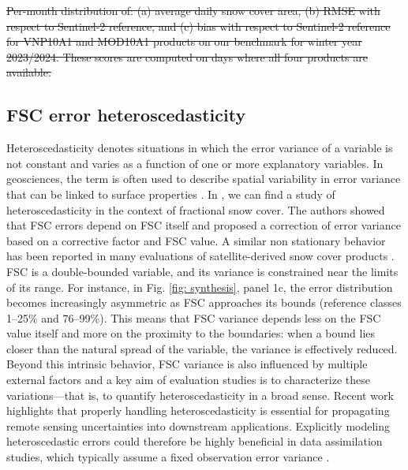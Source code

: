 \documentclass[tc, manuscript]{copernicus}
\providecommand{\DIFdeltex}[1]{{\protect\color{red}\sout{#1}}}                      %
\providecommand{\DIFdelbegin}{} %
\providecommand{\DIFdelend}{} %
\providecommand{\DIFdelFL}[1]{\DIFdel{#1}} %
\providecommand{\DIFdel}[1]{\texorpdfstring{\DIFdeltex{#1}}{}} %
\begin{document}
\DIFdelbegin %
{%
\DIFdelFL{Per-month distribution of: (a) average daily snow cover area, (b) RMSE with respect to Sentinel-2 reference, and (c) bias with respect to Sentinel-2 reference for VNP10A1 and MOD10A1 products on our benchmark for winter year 2023/2024. These scores are computed on days where all four products are available.}}


\DIFdelend \subsection{FSC error heteroscedasticity} 

Heteroscedasticity denotes situations in which the error variance of a variable is not constant and varies as a function of one or more explanatory variables. In geosciences, the term is often used to describe spatial variability in error variance that can be linked to surface properties \citep{hugonnet2022UncertaintyAnalysisDigital}. In \citep{aalstad_evaluating_2020}, we can find a study of heteroscedasticity in the context of fractional snow cover. The authors showed that FSC errors depend on FSC itself and proposed a correction of error variance based on a corrective factor and FSC value. A similar non stationary behavior has been reported in many evaluations of satellite-derived snow cover products \citep{jacques-hamilton_measurement_2025, stillinger_landsat_2023, schwaizer2020SnowCoverExtentb}.
FSC is a double-bounded variable, and its variance is constrained near the limits of its range. For instance, in Fig. \ref{fig: synthesis}, panel 1c, the error distribution becomes increasingly asymmetric as FSC approaches its bounds (reference classes 1–25\% and 76–99\%). This means that FSC variance depends less on the FSC value itself and more on the proximity to the boundaries: when a bound lies closer than the natural spread of the variable, the variance is effectively reduced. Beyond this intrinsic behavior, FSC variance is also influenced by multiple external factors and a key aim of evaluation studies is to characterize these variations—that is, to quantify heteroscedasticity in a broad sense. Recent work \citep{hugonnet2022UncertaintyAnalysisDigital} highlights that properly handling heteroscedasticity is essential for propagating remote sensing uncertainties into downstream applications. Explicitly modeling heteroscedastic errors could therefore be highly beneficial in data assimilation studies, which typically assume a fixed observation error variance \citep{baba_assimilation_2018}.
\end{document}
